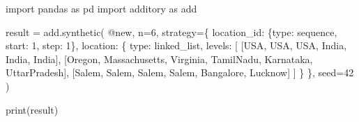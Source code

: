 \documentclass[
  letterpaper,
]{scrbook}
\newenvironment{Shaded}{\begin{snugshade}}{\end{snugshade}}
\newcommand{\BuiltInTok}[1]{\textcolor[rgb]{0.00,0.23,0.31}{#1}}
\newcommand{\DecValTok}[1]{\textcolor[rgb]{0.68,0.00,0.00}{#1}}
\newcommand{\ImportTok}[1]{\textcolor[rgb]{0.00,0.46,0.62}{#1}}
\newcommand{\NormalTok}[1]{\textcolor[rgb]{0.00,0.23,0.31}{#1}}
\newcommand{\OperatorTok}[1]{\textcolor[rgb]{0.37,0.37,0.37}{#1}}
\newcommand{\StringTok}[1]{\textcolor[rgb]{0.13,0.47,0.30}{#1}}
\begin{document}
\begin{Shaded}
\begin{Highlighting}[]
\ImportTok{import}\NormalTok{ pandas }\ImportTok{as}\NormalTok{ pd}
\ImportTok{import}\NormalTok{ additory }\ImportTok{as}\NormalTok{ add}

\NormalTok{result }\OperatorTok{=}\NormalTok{ add.synthetic(}
    \StringTok{\textquotesingle{}@new\textquotesingle{}}\NormalTok{,}
\NormalTok{    n}\OperatorTok{=}\DecValTok{6}\NormalTok{,}
\NormalTok{    strategy}\OperatorTok{=}\NormalTok{\{}
        \StringTok{\textquotesingle{}location\_id\textquotesingle{}}\NormalTok{: \{}\StringTok{\textquotesingle{}type\textquotesingle{}}\NormalTok{: }\StringTok{\textquotesingle{}sequence\textquotesingle{}}\NormalTok{, }\StringTok{\textquotesingle{}start\textquotesingle{}}\NormalTok{: }\DecValTok{1}\NormalTok{, }\StringTok{\textquotesingle{}step\textquotesingle{}}\NormalTok{: }\DecValTok{1}\NormalTok{\},}
        \StringTok{\textquotesingle{}location\textquotesingle{}}\NormalTok{: \{}
            \StringTok{\textquotesingle{}type\textquotesingle{}}\NormalTok{: }\StringTok{\textquotesingle{}linked\_list\textquotesingle{}}\NormalTok{,}
            \StringTok{\textquotesingle{}levels\textquotesingle{}}\NormalTok{: [}
\NormalTok{                [}\StringTok{\textquotesingle{}USA\textquotesingle{}}\NormalTok{, }\StringTok{\textquotesingle{}USA\textquotesingle{}}\NormalTok{, }\StringTok{\textquotesingle{}USA\textquotesingle{}}\NormalTok{, }\StringTok{\textquotesingle{}India\textquotesingle{}}\NormalTok{, }\StringTok{\textquotesingle{}India\textquotesingle{}}\NormalTok{, }\StringTok{\textquotesingle{}India\textquotesingle{}}\NormalTok{],}
\NormalTok{                [}\StringTok{\textquotesingle{}Oregon\textquotesingle{}}\NormalTok{, }\StringTok{\textquotesingle{}Massachusetts\textquotesingle{}}\NormalTok{, }\StringTok{\textquotesingle{}Virginia\textquotesingle{}}\NormalTok{, }\StringTok{\textquotesingle{}TamilNadu\textquotesingle{}}\NormalTok{, }\StringTok{\textquotesingle{}Karnataka\textquotesingle{}}\NormalTok{, }\StringTok{\textquotesingle{}UttarPradesh\textquotesingle{}}\NormalTok{],}
\NormalTok{                [}\StringTok{\textquotesingle{}Salem\textquotesingle{}}\NormalTok{, }\StringTok{\textquotesingle{}Salem\textquotesingle{}}\NormalTok{, }\StringTok{\textquotesingle{}Salem\textquotesingle{}}\NormalTok{, }\StringTok{\textquotesingle{}Salem\textquotesingle{}}\NormalTok{, }\StringTok{\textquotesingle{}Bangalore\textquotesingle{}}\NormalTok{, }\StringTok{\textquotesingle{}Lucknow\textquotesingle{}}\NormalTok{]}
\NormalTok{            ]}
\NormalTok{        \}}
\NormalTok{    \},}
\NormalTok{    seed}\OperatorTok{=}\DecValTok{42}
\NormalTok{)}

\BuiltInTok{print}\NormalTok{(result)}
\end{Highlighting}
\end{Shaded}
\end{document}
